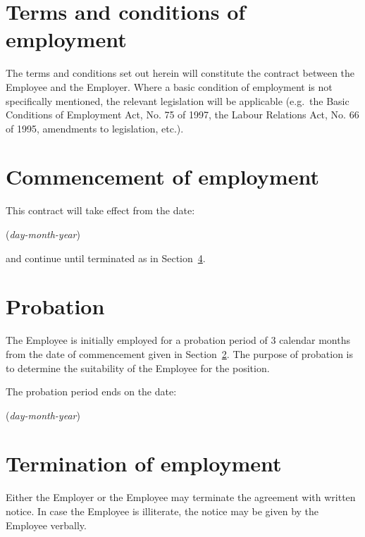 \documentclass[a4paper,11pt]{article}
\begin{document}
\noindent\hrulefill %

\section{Terms and conditions of employment}

\para The terms and conditions set out herein will constitute the contract
between the Employee and the Employer. Where a basic condition of employment is
not specifically mentioned, the relevant legislation will be applicable (e.g.\
the Basic Conditions of Employment Act, No. 75 of 1997, the Labour Relations
Act, No. 66 of 1995, amendments to legislation, etc.).

\section{Commencement of employment}
\label{commencement}

\para This contract will take effect from the date:

\begin{center}

  (\textit{day-month-year})
\end{center}

\noindent and continue until terminated as in Section~\ref{termination}.

\section{Probation}
\label{probation}

\para The Employee is initially employed for a probation period of 3 calendar
months from the date of commencement given in Section~\ref{commencement}. The
purpose of probation is to determine the suitability of the Employee for the
position.

\para The probation period ends on the date:

\begin{center}

  (\textit{day-month-year})
\end{center}

\section{Termination of employment}
\label{termination}

\para Either the Employer or the Employee may terminate the agreement with
written notice. In case the Employee is illiterate, the notice may be given by
the Employee verbally.
\end{document}
